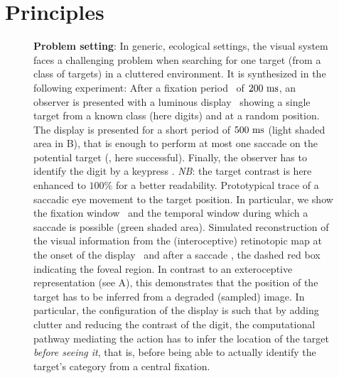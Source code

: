 

\section*{Principles}
\label{sec:principles}

\begin{figure}[t!]%
	\caption{%
		{\bf Problem setting}: In generic, ecological settings, the visual system faces a challenging problem when searching for one target (from a class of targets) in a cluttered environment. It is synthesized in the following experiment: %
		\A After a fixation period \FIX\ of $200~\si{\milli\second}$, an observer is presented with a luminous display \DIS\ showing a single target from a known class (here digits) and at a random position. The display is presented for a short period of $500~\si{\milli\second}$ (light shaded area in B), that is enough to perform at most one saccade on the potential target (\SAC , here successful). Finally, the observer has to identify the digit by a keypress \ANS. \emph{NB}: the target contrast is here enhanced to $100\%$ for a better readability. %
		\B Prototypical trace of a saccadic eye movement to the target position. In particular, we show the fixation window \FIX\ and the temporal window during which a saccade is possible (green shaded area). %
		\C Simulated reconstruction of the visual information from the (interoceptive) retinotopic map at the onset of the display \DIS\ and after a saccade \SAC , the dashed red box indicating the foveal region. In contrast to an exteroceptive representation (see A), this demonstrates that the position of the target has to be inferred from a degraded (sampled) image. In particular, the configuration of the display is such that by adding clutter and reducing the contrast of the digit, %
		the computational pathway mediating the action has to infer the location of the target \emph{before seeing it}, that is, before being able to actually identify the target's category from a central fixation. }%
	\label{fig:intro} %
\end{figure}%

